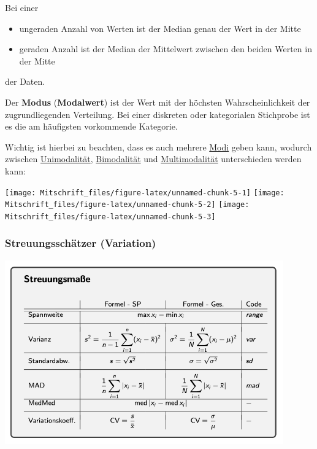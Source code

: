 \documentclass[
]{article}
\providecommand{\tightlist}{%
  \setlength{\itemsep}{0pt}\setlength{\parskip}{0pt}}
\begin{document}
Bei einer

\begin{itemize}
\tightlist
\item
  ungeraden Anzahl von Werten ist der Median genau der Wert in der Mitte
\item
  geraden Anzahl ist der Median der Mittelwert zwischen den beiden
  Werten in der Mitte
\end{itemize}

der Daten. \endtcolorbox

\tcolorbox

Der \textbf{Modus} (\textbf{Modalwert}) ist der Wert mit der höchsten
Wahrscheinlichkeit der zugrundliegenden Verteilung. Bei einer diskreten
oder kategorialen Stichprobe ist es die am häufigsten vorkommende
Kategorie.

\vspace{1mm}

Wichtig ist hierbei zu beachten, dass es auch mehrere \underline{Modi}
geben kann, wodurch zwischen \underline{Unimodalität},
\underline{Bimodalität} und \underline{Multimodalität} unterschieden
werden kann:

\vspace{5mm}

\texttt{[image: Mitschrift\_files/figure-latex/unnamed-chunk-5-1]}
\texttt{[image: Mitschrift\_files/figure-latex/unnamed-chunk-5-2]}
\texttt{[image: Mitschrift\_files/figure-latex/unnamed-chunk-5-3]}
\endtcolorbox

\hypertarget{streuungsschuxe4tzer-variation}{%
\subsubsection{Streuungsschätzer
(Variation)}\label{streuungsschuxe4tzer-variation}}

\includegraphics[width=12cm, center]{Fig4}
\end{document}
